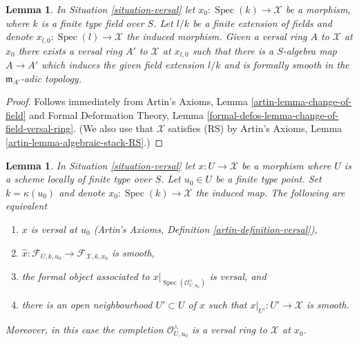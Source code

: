 \documentclass{stacks-project}
\theoremstyle{plain}
\newtheorem{lemma}[subsection]{Lemma}
\theoremstyle{definition}
\theoremstyle{remark}
\numberwithin{equation}{subsection}
\def\Spec{\mathop{\mathrm{Spec}}}
\begin{document}
\begin{lemma}
\label{lemma-versal-ring-field-extension}
In Situation \ref{situation-versal} let $x_0 : \Spec(k) \to \mathcal{X}$
be a morphism, where $k$ is a finite type field over $S$.
Let $l/k$ be a finite extension of fields and denote
$x_{l, 0} : \Spec(l) \to \mathcal{X}$ the induced morphism.
Given a versal ring $A$ to $\mathcal{X}$ at $x_0$ there exists
a versal ring $A'$ to $\mathcal{X}$ at $x_{l, 0}$ such that
there is a $S$-algebra map $A \to A'$ which induces the given
field extension $l/k$ and is formally smooth in the $\mathfrak m_{A'}$-adic
topology.
\end{lemma}

\begin{proof}
Follows immediately from
Artin's Axioms, Lemma \ref{artin-lemma-change-of-field}
and
Formal Deformation Theory, Lemma
\ref{formal-defos-lemma-change-of-field-versal-ring}.
(We also use that $\mathcal{X}$ satisfies (RS) by
Artin's Axioms, Lemma \ref{artin-lemma-algebraic-stack-RS}.)
\end{proof}

\begin{lemma}
\label{lemma-compare-versal-ring-completion}
In Situation \ref{situation-versal} let $x : U \to \mathcal{X}$ be a
morphism where $U$ is a scheme locally of finite type over $S$.
Let $u_0 \in U$ be a finite type point.
Set $k = \kappa(u_0)$ and denote $x_0 : \Spec(k) \to \mathcal{X}$
the induced map. The following are equivalent
\begin{enumerate}
\item $x$ is versal at $u_0$
(Artin's Axioms, Definition \ref{artin-definition-versal}),
\item $\hat x : \mathcal{F}_{U, k, u_0} \to \mathcal{F}_{\mathcal{X}, k, x_0}$
is smooth,
\item the formal object associated to
$x|_{\Spec(\mathcal{O}_{U, u_0}^\wedge)}$ is versal, and
\item there is an open neighbourhood $U' \subset U$ of $x$ such that
$x|_{U'} : U' \to \mathcal{X}$ is smooth.
\end{enumerate}
Moreover, in this case the completion $\mathcal{O}_{U, u_0}^\wedge$
is a versal ring to $\mathcal{X}$ at $x_0$.
\end{lemma}
\end{document}
